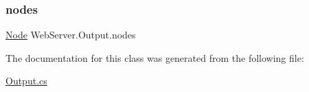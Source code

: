 \subsubsection{\texorpdfstring{nodes}{nodes}}
{\footnotesize\ttfamily \hyperlink{class_web_server_1_1_node}{Node} Web\+Server.\+Output.\+nodes\hspace{0.3cm}{\ttfamily [private]}}



The documentation for this class was generated from the following file\+:\begin{DoxyCompactItemize}
\item 
\hyperlink{_output_8cs}{Output.\+cs}\end{DoxyCompactItemize}
